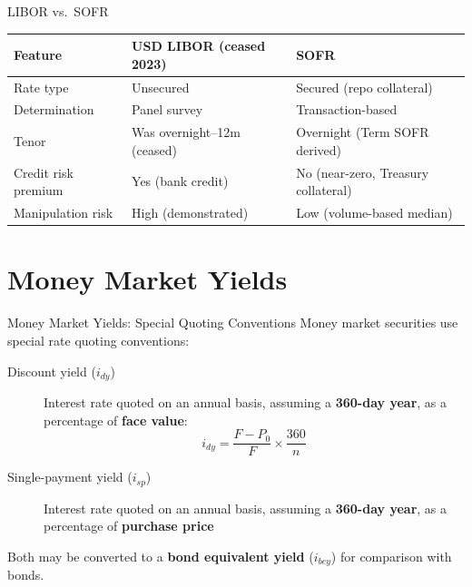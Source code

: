 \documentclass[aspectratio=169]{beamer}
\begin{document}
\begin{frame}{LIBOR vs.\ SOFR}
\begin{table}
\centering
\small
\begin{tabular}{llp{}}
\toprule
\textbf{Feature} & \textbf{USD LIBOR (ceased 2023)} & \textbf{SOFR} \\
\midrule
Rate type & Unsecured & Secured (repo collateral) \\
Determination & Panel survey & Transaction-based \\
Tenor & Was overnight--12m (ceased) & Overnight (Term SOFR derived) \\
Credit risk premium & Yes (bank credit) & No (near-zero, Treasury collateral) \\
Manipulation risk & High (demonstrated) & Low (volume-based median) \\
\bottomrule
\end{tabular}
\end{table}
\end{frame}


\section{Money Market Yields}

\begin{frame}{Money Market Yields: Special Quoting Conventions}
Money market securities use special rate quoting conventions:
\begin{description}
  \item[Discount yield ($i_{dy}$)] Interest rate quoted on an annual basis, assuming a \textbf{360-day year}, as a percentage of \textbf{face value}:
  \[
  i_{dy} = \frac{F - P_0}{F} \times \frac{360}{n}
  \]
  \item[Single-payment yield ($i_{sp}$)] Interest rate quoted on an annual basis, assuming a \textbf{360-day year}, as a percentage of \textbf{purchase price}
\end{description}
Both may be converted to a \textbf{bond equivalent yield} ($i_{bey}$) for comparison with bonds.
\end{frame}
\end{document}
